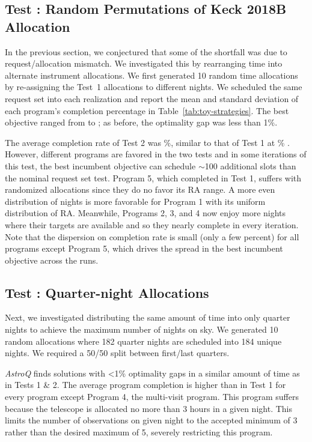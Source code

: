 \documentclass[twocolumn,linenumbers]{aastex63}
\newcommand{\AstroQ}{\textit{AstroQ}\xspace}
\begin{document}
\label{test:2018B-random}
\subsection{Test : Random Permutations of Keck 2018B Allocation}
\label{sec:inst_allocation}
In the previous section, we conjectured that some of the shortfall was due to request/allocation mismatch. We investigated this by rearranging time into alternate instrument allocations. We first generated 10 random time allocations by re-assigning the Test~1 allocations to different nights. We scheduled the same request set into each realization and report the mean and standard deviation of each program's completion percentage in Table~\ref{tab:toy-strategies}. The best objective ranged from  to ; as before, the optimality gap was less than 1\%. 

The average completion rate of Test 2 was \%, similar to that of Test 1 at \% . However, different programs are favored in the two tests and in some iterations of this test, the best incumbent objective can schedule $\sim$100 additional slots than the nominal request set test. Program 5, which completed in Test 1, suffers with randomized allocations since they do no favor its RA range. A more even distribution of nights is more favorable for Program 1 with its uniform distribution of RA. Meanwhile, Programs 2, 3, and 4 now enjoy more nights where their targets are available and so they nearly complete in every iteration. Note that the dispersion on completion rate is small (only a few percent) for all programs except Program 5, which drives the spread in the best incumbent objective across the runs. 

\label{test:quarter}
\subsection{Test : Quarter-night Allocations}
\label{sec:inst_allocation_everynight}

Next, we investigated distributing the same amount of time into only quarter nights to achieve the maximum number of nights on sky. We generated 10 random allocations where 182 quarter nights are scheduled into 184 unique nights. We required a 50/50 split between first/last quarters.

\AstroQ finds solutions with <1\% optimality gaps in a similar amount of time as in Tests 1 \& 2. The average program completion is higher than in Test 1 for every program except Program 4, the multi-visit program. This program suffers because the telescope is allocated no more than 3 hours in a given night. This limits the number of observations on given night to the accepted minimum of 3 rather than the desired maximum of 5, severely restricting this program. 
\end{document}
